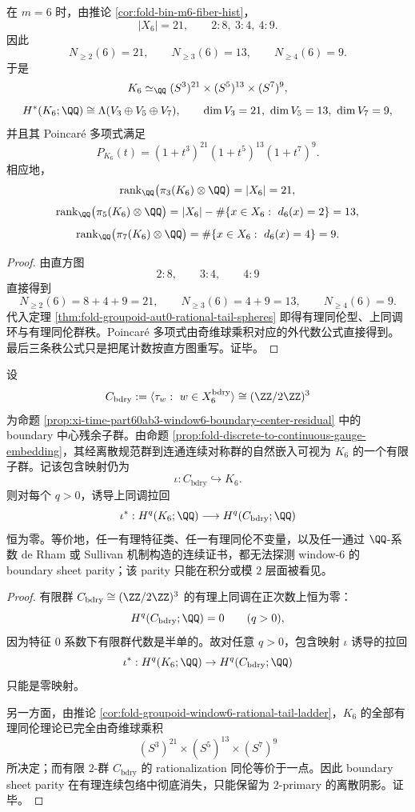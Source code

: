 \begin{corollary}\label{cor:fold-groupoid-window6-rational-tail-ladder}
在 \(m=6\) 时，由推论 \ref{cor:fold-bin-m6-fiber-hist}，
\[
|X_6|=21,
\qquad
2:8,\ 3:4,\ 4:9.
\]
因此
\[
N_{\ge 2}(6)=21,\qquad
N_{\ge 3}(6)=13,\qquad
N_{\ge 4}(6)=9.
\]
于是
\[
K_6\simeq_{\QQ}(S^3)^{21}\times (S^5)^{13}\times (S^7)^9,
\]
\[
H^\ast(K_6;\QQ)\cong \Lambda(V_3\oplus V_5\oplus V_7),
\qquad
\dim V_3=21,\ \dim V_5=13,\ \dim V_7=9,
\]
并且其 Poincar\'e 多项式满足
\[
P_{K_6}(t)=(1+t^3)^{21}(1+t^5)^{13}(1+t^7)^9.
\]
相应地，
\[
\operatorname{rank}_{\QQ}\bigl(\pi_3(K_6)\otimes\QQ\bigr)=|X_6|=21,
\]
\[
\operatorname{rank}_{\QQ}\bigl(\pi_5(K_6)\otimes\QQ\bigr)
=
|X_6|-\#\{x\in X_6:\ d_6(x)=2\}
=13,
\]
\[
\operatorname{rank}_{\QQ}\bigl(\pi_7(K_6)\otimes\QQ\bigr)
=
\#\{x\in X_6:\ d_6(x)=4\}
=9.
\]
\end{corollary}
\begin{proof}
由直方图
\[
2:8,\qquad 3:4,\qquad 4:9
\]
直接得到
\[
N_{\ge 2}(6)=8+4+9=21,
\qquad
N_{\ge 3}(6)=4+9=13,
\qquad
N_{\ge 4}(6)=9.
\]
代入定理 \ref{thm:fold-groupoid-aut0-rational-tail-spheres} 即得有理同伦型、上同调环与有理同伦群秩。Poincar\'e 多项式由奇维球乘积对应的外代数公式直接得到。最后三条秩公式只是把尾计数按直方图重写。证毕。
\end{proof}

\begin{proposition}\label{prop:fold-groupoid-window6-boundary-parity-rationally-invisible}
设
\[
C_{\mathrm{bdry}}
:=
\langle \tau_w:\ w\in X_6^{\mathrm{bdry}}\rangle
\cong (\ZZ/2\ZZ)^3
\]
为命题 \ref{prop:xi-time-part60ab3-window6-boundary-center-residual} 中的 boundary 中心残余子群。由命题 \ref{prop:fold-discrete-to-continuous-gauge-embedding}，其经离散规范群到连通连续对称群的自然嵌入可视为 \(K_6\) 的一个有限子群。记该包含映射仍为
\[
\iota:C_{\mathrm{bdry}}\hookrightarrow K_6.
\]
则对每个 \(q>0\)，诱导上同调拉回
\[
\iota^\ast:H^q(K_6;\QQ)\longrightarrow H^q(C_{\mathrm{bdry}};\QQ)
\]
恒为零。等价地，任一有理特征类、任一有理同伦不变量，以及任一通过 \(\QQ\)-系数 de Rham 或 Sullivan 机制构造的连续证书，都无法探测 window-\(6\) 的 boundary sheet parity；该 parity 只能在积分或模 \(2\) 层面被看见。
\end{proposition}
\begin{proof}
有限群 \(C_{\mathrm{bdry}}\cong(\ZZ/2\ZZ)^3\) 的有理上同调在正次数上恒为零：
\[
H^q(C_{\mathrm{bdry}};\QQ)=0
\qquad (q>0),
\]
因为特征 \(0\) 系数下有限群代数是半单的。故对任意 \(q>0\)，包含映射 \(\iota\) 诱导的拉回
\[
\iota^\ast:H^q(K_6;\QQ)\to H^q(C_{\mathrm{bdry}};\QQ)
\]
只能是零映射。

另一方面，由推论 \ref{cor:fold-groupoid-window6-rational-tail-ladder}，\(K_6\) 的全部有理同伦理论已完全由奇维球乘积
\[
(S^3)^{21}\times (S^5)^{13}\times (S^7)^9
\]
所决定；而有限 \(2\)-群 \(C_{\mathrm{bdry}}\) 的 rationalization 同伦等价于一点。因此 boundary sheet parity 在有理连续包络中彻底消失，只能保留为 \(2\)-primary 的离散阴影。证毕。
\end{proof}
